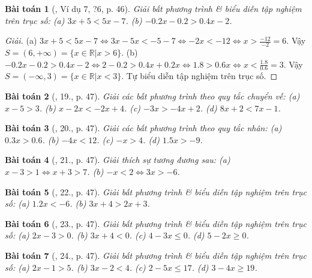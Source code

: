 \documentclass{article}
\newtheorem{baitoan}{Bài toán}
\begin{document}
\begin{baitoan}[\cite{SGK_Toan_8_tap_2}, Ví dụ 7, ?6, p. 46]
	Giải bất phương trình \& biểu diễn tập nghiệm trên trục số: (a) $3x + 5 < 5x - 7$. (b) $-0.2x - 0.2 > 0.4x - 2$.
\end{baitoan}

\begin{proof}[Giải]
	(a) $3x + 5 < 5x - 7\Leftrightarrow 3x - 5x < -5 - 7\Leftrightarrow -2x < -12\Leftrightarrow x > \frac{-12}{-2} = 6$. Vậy $S = (6,+\infty) = \{x\in\mathbb{R}|x > 6\}$. (b) $-0.2x - 0.2 > 0.4x - 2\Leftrightarrow 2 - 0.2 > 0.4x + 0.2x\Leftrightarrow 1.8 > 0.6x\Leftrightarrow x < \frac{1.8}{0.6} = 3$. Vậy $S = (-\infty,3) = \{x\in\mathbb{R}|x < 3\}$. Tự biểu diễn tập nghiệm trên trục số.
\end{proof}

\begin{baitoan}[\cite{SGK_Toan_8_tap_2}, 19., p. 47]
	Giải các bất phương trình theo quy tắc chuyển vế: (a) $x - 5 > 3$. (b) $x - 2x < -2x + 4$. (c) $-3x > -4x + 2$. (d) $8x + 2 < 7x - 1$.
\end{baitoan}

\begin{baitoan}[\cite{SGK_Toan_8_tap_2}, 20., p. 47]
	Giải các bất phương trình theo quy tắc nhân: (a) $0.3x > 0.6$. (b) $-4x < 12$. (c) $-x > 4$. (d) $1.5x > -9$.
\end{baitoan}

\begin{baitoan}[\cite{SGK_Toan_8_tap_2}, 21., p. 47]
	Giải thích sự tương đương sau: (a) $x - 3 > 1\Leftrightarrow x + 3 > 7$. (b) $-x < 2\Leftrightarrow3x > -6$.
\end{baitoan}

\begin{baitoan}[\cite{SGK_Toan_8_tap_2}, 22., p. 47]
	Giải bất phương trình \& biểu diễn tập nghiệm trên trục số: (a) $1.2x < -6$. (b) $3x + 4 > 2x + 3$.
\end{baitoan}

\begin{baitoan}[\cite{SGK_Toan_8_tap_2}, 23., p. 47]
	Giải bất phương trình \& biểu diễn tập nghiệm trên trục số: (a) $2x - 3 > 0$. (b) $3x + 4 < 0$. (c) $4 - 3x\le0$. (d) $5 - 2x\ge0$.
\end{baitoan}

\begin{baitoan}[\cite{SGK_Toan_8_tap_2}, 24., p. 47]
	Giải bất phương trình \& biểu diễn tập nghiệm trên trục số: (a) $2x - 1 > 5$. (b) $3x - 2 < 4$. (c) $2 - 5x\le17$. (d) $3 - 4x\ge19$.
\end{baitoan}
\end{document}
